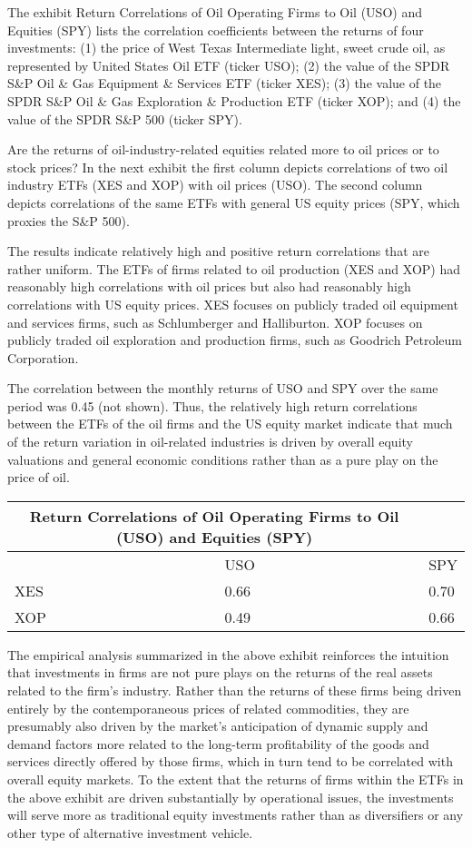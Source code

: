 \documentclass[11pt]{article}
\begin{document}
The exhibit Return Correlations of Oil Operating Firms to Oil (USO) and Equities (SPY) lists the correlation coefficients between the returns of four investments: (1) the price of West Texas Intermediate light, sweet crude oil, as represented by United States Oil ETF (ticker USO); (2) the value of the SPDR S\&P Oil \& Gas Equipment \& Services ETF (ticker XES); (3) the value of the SPDR S\&P Oil \& Gas Exploration \& Production ETF (ticker XOP); and (4) the value of the SPDR S\&P 500 (ticker SPY).

Are the returns of oil-industry-related equities related more to oil prices or to stock prices? In the next exhibit the first column depicts correlations of two oil industry ETFs (XES and XOP) with oil prices (USO). The second column depicts correlations of the same ETFs with general US equity prices (SPY, which proxies the S\&P 500).

The results indicate relatively high and positive return correlations that are rather uniform. The ETFs of firms related to oil production (XES and XOP) had reasonably high correlations with oil prices but also had reasonably high correlations with US equity prices. XES focuses on publicly traded oil equipment and services firms, such as Schlumberger and Halliburton. XOP focuses on publicly traded oil exploration and production firms, such as Goodrich Petroleum Corporation.

The correlation between the monthly returns of USO and SPY over the same period was 0.45 (not shown). Thus, the relatively high return correlations between the ETFs of the oil firms and the US equity market indicate that much of the return variation in oil-related industries is driven by overall equity valuations and general economic conditions rather than as a pure play on the price of oil.

\begin{center}
\begin{tabular}{|lll|}
\multicolumn{2}{|c|}{Return Correlations of Oil Operating Firms to Oil (USO) and Equities (SPY)} &  \\
\hline
 & USO & SPY \\
\hline
XES & 0.66 & 0.70 \\
XOP & 0.49 & 0.66 \\
\hline
\end{tabular}
\end{center}

The empirical analysis summarized in the above exhibit reinforces the intuition that investments in firms are not pure plays on the returns of the real assets related to the firm's industry. Rather than the returns of these firms being driven entirely by the contemporaneous prices of related commodities, they are presumably also driven by the market's anticipation of dynamic supply and demand factors more related to the long-term profitability of the goods and services directly offered by those firms, which in turn tend to be correlated with overall equity markets. To the extent that the returns of firms within the ETFs in the above exhibit are driven substantially by operational issues, the investments will serve more as traditional equity investments rather than as diversifiers or any other type of alternative investment vehicle.
\end{document}
